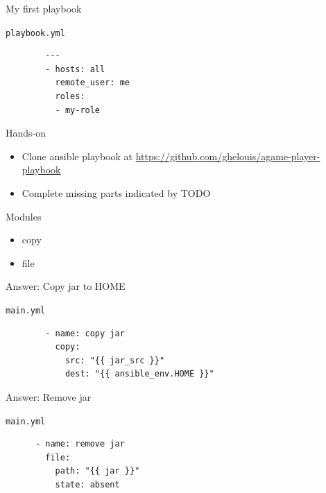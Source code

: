 \documentclass{beamer}
\begin{document}
\begin{frame}[fragile]{My first playbook}
  \begin{exampleblock}{\tt playbook.yml} {
      \begin{verbatim}
        ---
        - hosts: all
          remote_user: me
          roles:
          - my-role
      \end{verbatim}
    }
  \end{exampleblock}
\end{frame}

\begin{frame}{Hands-on}
  \begin{itemize}
    \item Clone ansible playbook at \href{https://github.com/ghelouis/agame-player-playbook}{https://github.com/ghelouis/agame-player-playbook}
    \item {Complete missing parts indicated by TODO}
  \end{itemize}
\end{frame}

\begin{frame}{Modules}
  \begin{itemize}
    \item copy
    \item file
  \end{itemize}
\end{frame}

\begin{frame}[fragile]{Answer: Copy jar to HOME}
  \begin{exampleblock}{\tt main.yml} {
      \begin{verbatim}
        - name: copy jar
          copy:
            src: "{{ jar_src }}"
            dest: "{{ ansible_env.HOME }}"
      \end{verbatim}
    }
  \end{exampleblock}
\end{frame}

\begin{frame}[fragile]{Answer: Remove jar}
  \begin{exampleblock}{\tt main.yml} {
      \begin{verbatim}
      - name: remove jar
        file:
          path: "{{ jar }}"
          state: absent
      \end{verbatim}
    }
  \end{exampleblock}
\end{frame}
\end{document}
